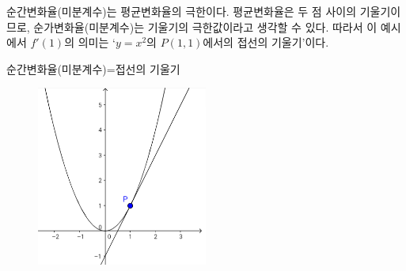 \documentclass{oblivoir}
\let\oldsection\section
\renewcommand\section{\clearpage\oldsection}
\begin{document}
\bigskip
순간변화율(미분계수)는 평균변화율의 극한이다.
평균변화율은 두 점 사이의 기울기이므로, 순가변화율(미분계수)는 기울기의 극한값이라고 생각할 수 있다.
따라서 이 예시에서 \(f'(1)\)의 의미는 `\(y=x^2\)의 \(P(1,1)\)에서의 접선의 기울기'이다.
\begin{mdframed}[leftmargin=60pt,rightmargin=60pt,innertopmargin=10pt,innerbottommargin=10pt]
\begin{center}
순간변화율(미분계수)=접선의 기울기
\end{center}
\end{mdframed}

\begin{figure}[h!]
\centering
\includegraphics[width=0.5\textwidth]{differential_coefficient_example}
\end{figure}


\end{document}
